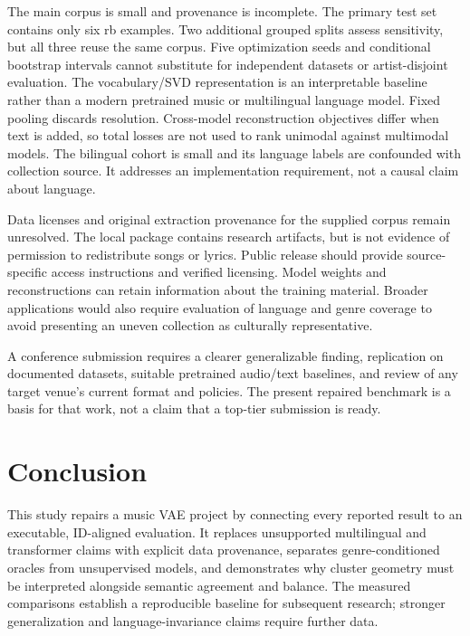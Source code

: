 \documentclass{article}
\begin{document}
The main corpus is small and provenance is incomplete. The primary test set
contains only six rb examples. Two additional grouped splits assess sensitivity,
but all three reuse the same corpus. Five optimization seeds
and conditional bootstrap intervals cannot substitute for independent datasets
or artist-disjoint evaluation. The vocabulary/SVD representation is an
interpretable baseline rather than a modern pretrained music or multilingual
language model. Fixed pooling discards resolution. Cross-model reconstruction
objectives differ when text is added, so total losses are not used to rank
unimodal against multimodal models. The bilingual cohort is small and its
language labels are confounded with collection source. It addresses an
implementation requirement, not a causal claim about language.

Data licenses and original extraction provenance for the supplied corpus remain
unresolved. The local package contains research artifacts, but is not evidence
of permission to redistribute songs or lyrics. Public release should provide
source-specific access instructions and verified licensing. Model weights and
reconstructions can retain information about the training material. Broader
applications would also require evaluation of language and genre coverage to
avoid presenting an uneven collection as culturally representative.

A conference submission requires a clearer generalizable finding, replication
on documented datasets, suitable pretrained audio/text baselines, and review of
any target venue's current format and policies. The present repaired benchmark
is a basis for that work, not a claim that a top-tier submission is ready.

\section{Conclusion}
This study repairs a music VAE project by connecting every reported result to
an executable, ID-aligned evaluation. It replaces unsupported multilingual and
transformer claims with explicit data provenance, separates genre-conditioned
oracles from unsupervised models, and demonstrates why cluster geometry must
be interpreted alongside semantic agreement and balance. The measured
comparisons establish a reproducible baseline for subsequent research;
stronger generalization and language-invariance claims require further data.

\clearpage


\end{document}
